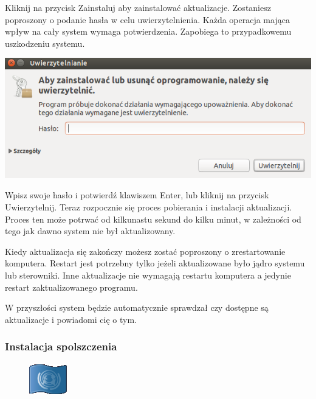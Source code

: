 Kliknij na przycisk \textcolor{ubuntu_orange}{Zainstaluj} aby zainstalować aktualizacje. Zostaniesz poproszony o podanie hasła w celu uwierzytelnienia. Każda operacja mająca wpływ na cały system wymaga potwierdzenia. Zapobiega to przypadkowemu uszkodzeniu systemu.
\begin{center}
	\vspace{-10pt}
	\includegraphics{images/unity_uwierzytelnienie.png}
\end{center}

Wpisz swoje hasło i potwierdź klawiszem Enter, lub kliknij na przycisk \textcolor{ubuntu_orange}{Uwierzytelnij}. Teraz rozpocznie się proces pobierania i instalacji aktualizacji. Proces ten może potrwać od kilkunastu sekund do kilku minut, w zależności od tego jak dawno system nie był aktualizowany.

Kiedy aktualizacja się zakończy możesz zostać poproszony o zrestartowanie komputera. Restart jest potrzebny tylko jeżeli aktualizowane było jądro systemu lub sterowniki. Inne aktualizacje nie wymagają restartu komputera a jedynie restart zaktualizowanego programu.

W przyszłości system będzie automatycznie sprawdzał czy dostępne są aktualizacje i powiadomi cię o tym.

\subsubsection{Instalacja spolszczenia}
\begin{figure}
	\vspace{-10pt}
	\includegraphics[width=\linewidth]{images/pierwsze_uruchomienie_lang1.png}
\end{figure}

